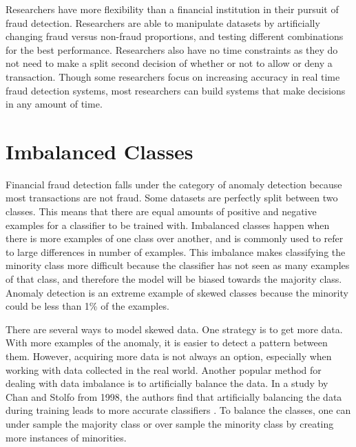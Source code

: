 \documentclass[midd]{thesis}
\begin{document}
Researchers have more flexibility than a financial institution in their pursuit of fraud detection. Researchers are able to manipulate datasets by artificially changing fraud versus non-fraud proportions, and testing different combinations for the best performance. Researchers also have no time constraints as they do not need to make a split second decision of whether or not to allow or deny a transaction. Though some researchers focus on increasing accuracy in real time fraud detection systems, most researchers can build systems that make decisions in any amount of time. 

\section{Imbalanced Classes} 

Financial fraud detection falls under the category of anomaly detection because most transactions are not fraud. Some datasets are perfectly split between two classes. This means that there are equal amounts of positive and negative examples for a classifier to be trained with. Imbalanced classes happen when there is more examples of one class over another, and is commonly used to refer to large differences in number of examples. This imbalance makes classifying the minority class more difficult because the classifier has not seen as many examples of that class, and therefore the model will be biased towards the majority class. Anomaly detection is an extreme example of skewed classes because the minority could be less than 1\% of the examples. 

There are several ways to model skewed data. One strategy is to get more data. With more examples of the anomaly, it is easier to detect a pattern between them. However, acquiring more data is not always an option, especially when working with data collected in the real world. Another popular method for dealing with data imbalance is to artificially balance the data.  In a study by Chan and Stolfo from 1998, the authors find that artificially balancing the data during training leads to more accurate classifiers \cite{Chan}. To balance the classes, one can under sample the majority class or over sample the minority class by creating more instances of minorities.
\end{document}
